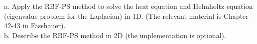 a. Apply the RBF-PS method to solve the heat equation and Helmholtz equation (eigenvalue problem for
the Laplacian) in 1D. (The relevant material is Chapter 42-43 in Fasshauer).\\

b. Describe the RBF-PS method in 2D (the implementation is optional).
